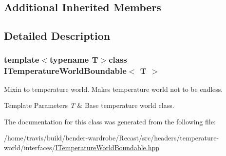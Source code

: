 \subsection*{Additional Inherited Members}


\subsection{Detailed Description}
\subsubsection*{template$<$typename T$>$class I\-Temperature\-World\-Boundable$<$ T $>$}

Mixin to temperature world. Makes temperature world not to be endless.


\begin{DoxyTemplParams}{Template Parameters}
{\em T} & Base temperature world class. \\
\hline
\end{DoxyTemplParams}


The documentation for this class was generated from the following file\-:\begin{DoxyCompactItemize}
\item 
/home/travis/build/bender-\/wardrobe/\-Recast/src/headers/temperature-\/world/interfaces/\hyperlink{_i_temperature_world_boundable_8hpp}{I\-Temperature\-World\-Boundable.\-hpp}\end{DoxyCompactItemize}
